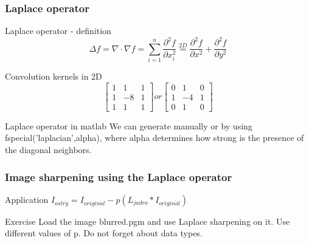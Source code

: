 \documentclass{beamer}
\begin{document}
\begin{frame}
\frametitle{Laplace operator} 
  \begin{block}{Laplace operator - definition}
    $$\Delta f = \nabla \cdot \nabla f = \sum_{i=1}^n \frac{\partial^2 f}{\partial x_i^2} \stackrel{2D}{=} \frac{\partial^2 f}{\partial x^2} + \frac{\partial^2 f}{\partial y^2}$$
  \end{block}
  
  \begin{block}{Convolution kernels in 2D}
  $$\begin{bmatrix}
    1 & 1 & 1 \\
    1 & -8 & 1 \\
    1 & 1 & 1 
   \end{bmatrix}
   or
   \begin{bmatrix}
    0 & 1 & 0 \\
    1 & -4 & 1 \\
    0 & 1 & 0 
   \end{bmatrix}$$
  \end{block}
    
 \begin{block}{Laplace operator in matlab}
 We can generate manually or by using fspecial('laplacian',alpha), where alpha determines how strong is the presence of the diagonal neighbors.
  \end{block}
\end{frame}

\begin{frame}
\frametitle{Image sharpening using the Laplace operator} 
  \begin{block}{Application}    
    $I_{ostr\acute{y}} = I_{origin\acute{a}l} - p \left( L_{jadro} \ast I_{origin\acute{a}l}\right)$
  \end{block}

  \begin{block}{Exercise}
  Load the image blurred.pgm and use Laplace sharpening on it. Use different values of p. Do not forget about data types.
  \end{block}
\end{frame}
\end{document}
